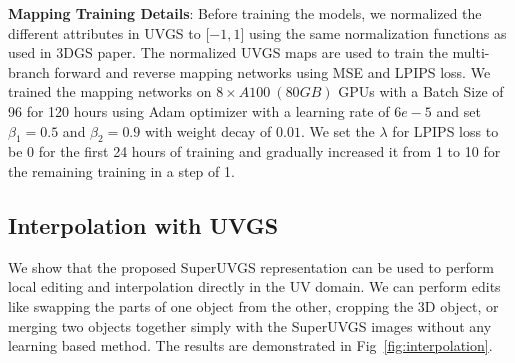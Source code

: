 \noindent \textbf{Mapping Training Details}: 
Before training the models, we normalized the different attributes in UVGS to [$-1,1$] using the same normalization functions as used in 3DGS paper\cite{3dgs2023}. 
The normalized UVGS maps are used to train the multi-branch forward and reverse mapping networks using MSE and LPIPS loss.
We trained the mapping networks on $8 \times A100 ~(80GB)$ GPUs with a Batch Size of 96 for 120 hours using Adam optimizer with a learning rate of $6e-5$ and set $\beta_1 = 0.5$ and $\beta_2 = 0.9$ with weight decay of $0.01$. 
We set the $\lambda$ for LPIPS loss to be $0$ for the first 24 hours of training and gradually increased it from 1 to 10 for the remaining training in a step of 1. 



\subsection{Interpolation with UVGS}

We show that the proposed SuperUVGS representation can be used to perform local editing and interpolation directly in the UV domain. We can perform edits like swapping the parts of one object from the other, cropping the 3D object, or merging two objects together simply with the SuperUVGS images without any learning based method. The results are demonstrated in Fig~\ref{fig:interpolation}.


